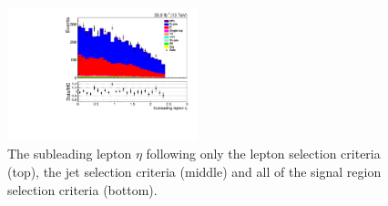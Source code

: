 \begin{figure}[ht]
\includegraphics[width=0.49\textwidth]{figs/background-estimation/plots/unblinded/prompt_mumu_ttbarInc/lep2Eta_NPL_mumu_wMass_mumu.pdf}
\caption{
The subleading lepton $\eta$ following only the lepton selection criteria (top), the jet selection criteria (middle) and all of the signal region selection criteria (bottom).
}
\label{fig:App_SR_lep2Eta}
\end{figure}


